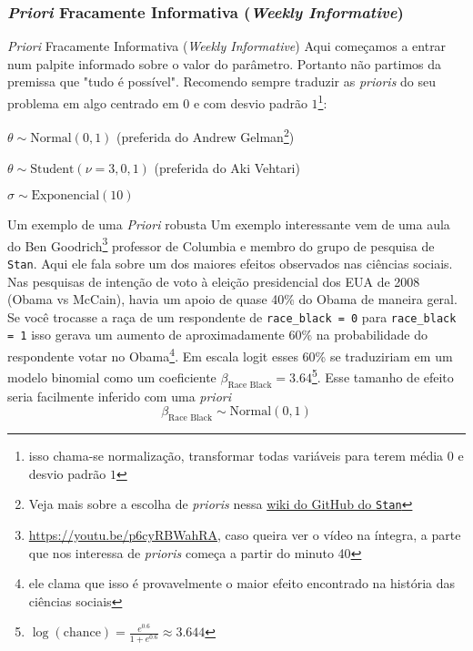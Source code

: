\subsubsection{\textit{Priori} Fracamente Informativa (\textit{Weekly Informative})}
\begin{frame}{\textit{Priori} Fracamente Informativa (\textit{Weekly Informative})}
	Aqui começamos a entrar num palpite informado sobre o valor do parâmetro.
	Portanto não partimos da premissa que "tudo é possível".
	\vfill
	Recomendo sempre traduzir as \textit{prioris} do seu problema em algo
	centrado em $0$ e com desvio padrão $1$\footnote{isso chama-se normalização,
		transformar todas variáveis para terem média $0$ e desvio padrão $1$}:
	\vfill
	\begin{vfilleditems}
		\item $\theta \sim \text{Normal}(0, 1)$ (preferida do Andrew Gelman\footnote{Veja mais sobre a escolha de \textit{prioris} nessa \href{https://github.com/stan-dev/stan/wiki/Prior-Choice-Recommendations}{wiki do GitHub do \texttt{Stan}}})
		\item $\theta \sim \text{Student}(\nu=3, 0, 1)$ (preferida do Aki Vehtari)
		\item $\sigma \sim \text{Exponencial}(10)$
	\end{vfilleditems}
\end{frame}

\begin{frame}{Um exemplo de uma \textit{Priori} robusta}
	\footnotesize
	Um exemplo interessante vem de uma aula do Ben
	Goodrich\footnote{\url{https://youtu.be/p6cyRBWahRA}, caso queira ver o vídeo na íntegra, a parte que nos interessa de \textit{prioris} começa a partir do minuto 40}
	professor de Columbia e membro do grupo de pesquisa de \texttt{Stan}.
	\vfill
	Aqui ele fala sobre um dos maiores efeitos observados nas ciências sociais.
	Nas pesquisas de intenção de voto à eleição presidencial dos EUA de 2008 (Obama vs McCain),
	havia um apoio de quase 40\% do Obama de maneira geral.
	Se você trocasse a raça de um respondente de \lstinline!race_black = 0!
	para \lstinline!race_black = 1! isso gerava um aumento de aproximadamente 60\%
	na probabilidade do respondente votar no Obama\footnote{ele clama que isso é provavelmente
		o maior efeito encontrado na história das ciências sociais}.
	\vfill
	Em escala logit esses 60\% se
	traduziriam em um modelo binomial como um coeficiente
	$\beta_{\text{Race Black}} = 3.64$\footnote{$\log(\text{chance}) = \frac{e^{0.6}}{1 + e^{0.6}} \approx 3.644$}.
	Esse tamanho de efeito seria facilmente inferido com uma \textit{priori} $$\beta_{\text{Race Black}} \sim \text{Normal}(0, 1)$$
\end{frame}


